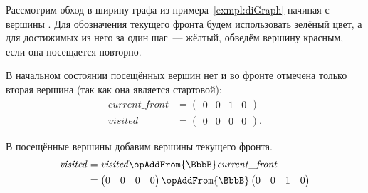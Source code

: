 \begin{example}

    Рассмотрим обход в ширину графа из примера~\ref{exmpl:diGraph} начиная с вершины .
    Для обозначения текущего фронта будем использовать зелёный цвет, а для достижимых из него за один шаг~--- жёлтый, обведём вершину красным, если она посещается повторно.

    В начальном состоянии посещённых вершин нет и во фронте отмечена только вторая вершина (так как она является стартовой):
    \begin{align*}
        \mathit{current\_front} & =
        \begin{pmatrix}
            0 & 0 & 1 & 0
        \end{pmatrix}
        \\
        \mathit{visited}        & =
        \begin{pmatrix}
            0 & 0 & 0 & 0
        \end{pmatrix}.
    \end{align*}

    \begin{marginfigure}
        \begin{center}
            \resizebox{\marginparwidth}{!}{}
        \end{center}
        \caption{Обход в ширину, шаг первый}
        \label{fig:bfs_step_1}
    \end{marginfigure}

    В посещённые вершины добавим вершины текущего фронта.
    \begin{align*}
        \mathit{visited} & = \mathit{visited} \opAddFrom{\BbbB} \mathit{current\_front} \\
                       & =
        \begin{pmatrix}
            0 & 0 & 0 & 0
        \end{pmatrix}\opAddFrom{\BbbB}
        \begin{pmatrix}
            0 & 0 & 1 & 0
        \end{pmatrix}
    \end{align*}


\end{example}
